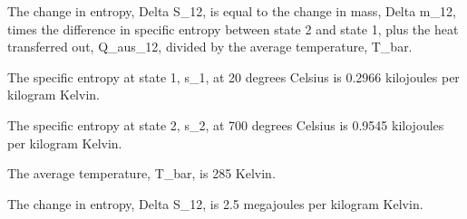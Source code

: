 The change in entropy, Delta S_12, is equal to the change in mass, Delta m_12, times the difference in specific entropy between state 2 and state 1, plus the heat transferred out, Q_aus_12, divided by the average temperature, T_bar.

The specific entropy at state 1, s_1, at 20 degrees Celsius is 0.2966 kilojoules per kilogram Kelvin.

The specific entropy at state 2, s_2, at 700 degrees Celsius is 0.9545 kilojoules per kilogram Kelvin.

The average temperature, T_bar, is 285 Kelvin.

The change in entropy, Delta S_12, is 2.5 megajoules per kilogram Kelvin.